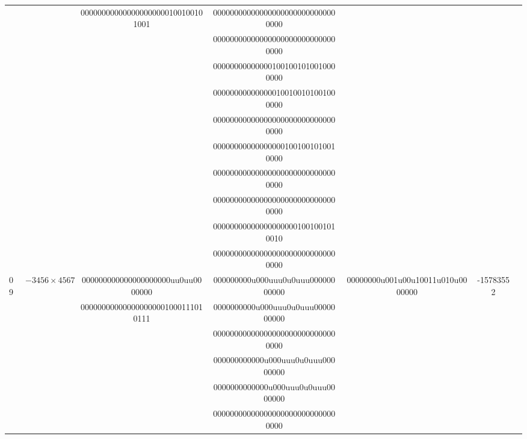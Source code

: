 \documentclass[electronics,article,accept,pdftex,moreauthors]{Definitions/mdpi}
\begin{document}
\begin{enumerate}[label={\arabic*).}]
\begin{table}[H]
{\begin{tabular}{lcccccc}
  &            &000000000000000000000100100101001&000000000000000000000000000000000&                                 &\\       
  &            &                                 &000000000000000000000000000000000&                                 &\\  
  &            &                                 &000000000000001001001010010000000&                                 &\\  
  &            &                                 &000000000000000100100101001000000&                                 &\\  
  &            &                                 &000000000000000000000000000000000&                                 &\\  
  &            &                                 &000000000000000001001001010010000&                                 &\\  
  &            &                                 &000000000000000000000000000000000&                                 &\\  
  &            &                                 &000000000000000000000000000000000&                                 &\\  
  &            &                                 &000000000000000000001001001010010&                                 &\\  
  &            &                                 &000000000000000000000000000000000&                                 &\\  
09&$-3456\times4567$&000000000000000000000uu0uu0000000&000000000u000uuu0u0uuu00000000000&00000000u001u00u10011u010u0000000&-15783552\\
  &            &000000000000000000001000111010111&0000000000u000uuu0u0uuu0000000000&                                 &\\       
  &            &                                 &000000000000000000000000000000000&                                   &\\  
  &            &                                 &000000000000u000uuu0u0uuu00000000&                                 &\\  
  &            &                                 &0000000000000u000uuu0u0uuu0000000&                                 &\\  
  &            &                                 &000000000000000000000000000000000&                                 &\\  

\end{tabular}}
\end{table}
\end{enumerate}
\end{document}
